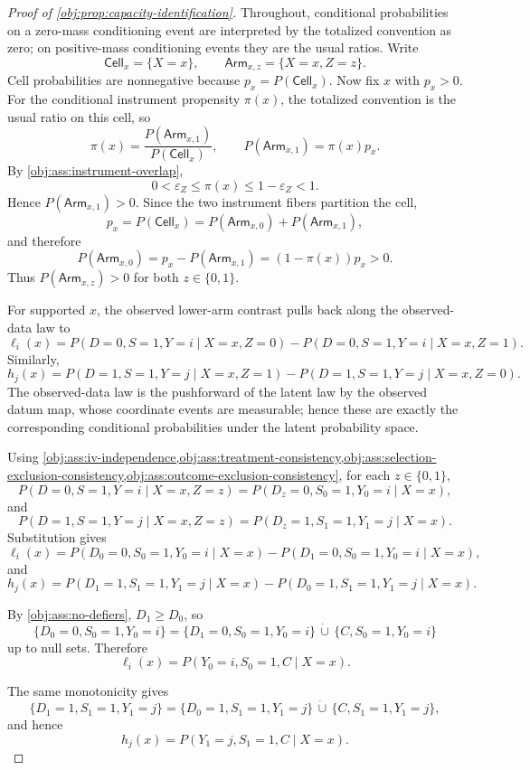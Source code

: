 \begin{proof}[Proof of \cref{obj:prop:capacity-identification}]
Throughout, conditional probabilities on a zero-mass conditioning event are interpreted by the totalized convention as zero; on positive-mass conditioning events they are the usual ratios.  Write
\[
\mathsf{Cell}_x=\{X=x\},\qquad
\mathsf{Arm}_{x,z}=\{X=x,Z=z\}.
\]
Cell probabilities are nonnegative because \(p_x=P(\mathsf{Cell}_x)\).  Now fix \(x\) with \(p_x>0\).  For the conditional instrument propensity \(\pi(x)\), the totalized convention is the usual ratio on this cell, so
\[
\pi(x)=\frac{P(\mathsf{Arm}_{x,1})}{P(\mathsf{Cell}_x)},
\qquad
P(\mathsf{Arm}_{x,1})=\pi(x)p_x .
\]
By \cref{obj:ass:instrument-overlap},
\[
0<\varepsilon_Z\le \pi(x)\le 1-\varepsilon_Z<1.
\]
Hence \(P(\mathsf{Arm}_{x,1})>0\).  Since the two instrument fibers partition the cell,
\[
p_x=P(\mathsf{Cell}_x)=P(\mathsf{Arm}_{x,0})+P(\mathsf{Arm}_{x,1}),
\]
and therefore
\[
P(\mathsf{Arm}_{x,0})=p_x-P(\mathsf{Arm}_{x,1})=(1-\pi(x))p_x>0.
\]
Thus \(P(\mathsf{Arm}_{x,z})>0\) for both \(z\in\{0,1\}\).

For supported \(x\), the observed lower-arm contrast pulls back along the observed-data law to
\[
\ell_i(x)
=
P(D=0,S=1,Y=i\mid X=x,Z=0)
-
P(D=0,S=1,Y=i\mid X=x,Z=1).
\]
Similarly,
\[
h_j(x)
=
P(D=1,S=1,Y=j\mid X=x,Z=1)
-
P(D=1,S=1,Y=j\mid X=x,Z=0).
\]
The observed-data law is the pushforward of the latent law by the observed datum map, whose coordinate events are measurable; hence these are exactly the corresponding conditional probabilities under the latent probability space.

Using \cref{obj:ass:iv-independence,obj:ass:treatment-consistency,obj:ass:selection-exclusion-consistency,obj:ass:outcome-exclusion-consistency}, for each \(z\in\{0,1\}\),
\[
P(D=0,S=1,Y=i\mid X=x,Z=z)
=
P(D_z=0,S_0=1,Y_0=i\mid X=x),
\]
and
\[
P(D=1,S=1,Y=j\mid X=x,Z=z)
=
P(D_z=1,S_1=1,Y_1=j\mid X=x).
\]
Substitution gives
\[
\ell_i(x)
=
P(D_0=0,S_0=1,Y_0=i\mid X=x)
-
P(D_1=0,S_0=1,Y_0=i\mid X=x),
\]
and
\[
h_j(x)
=
P(D_1=1,S_1=1,Y_1=j\mid X=x)
-
P(D_0=1,S_1=1,Y_1=j\mid X=x).
\]

By \cref{obj:ass:no-defiers}, \(D_1\ge D_0\), so
\[
\{D_0=0,S_0=1,Y_0=i\}
=
\{D_1=0,S_0=1,Y_0=i\}\,\dot\cup\,
\{C,S_0=1,Y_0=i\}
\]
up to null sets.  Therefore
\[
\ell_i(x)=P(Y_0=i,S_0=1,C\mid X=x).
\]

The same monotonicity gives
\[
\{D_1=1,S_1=1,Y_1=j\}
=
\{D_0=1,S_1=1,Y_1=j\}\,\dot\cup\,
\{C,S_1=1,Y_1=j\},
\]
and hence
\[
h_j(x)=P(Y_1=j,S_1=1,C\mid X=x).
\]


\end{proof}
